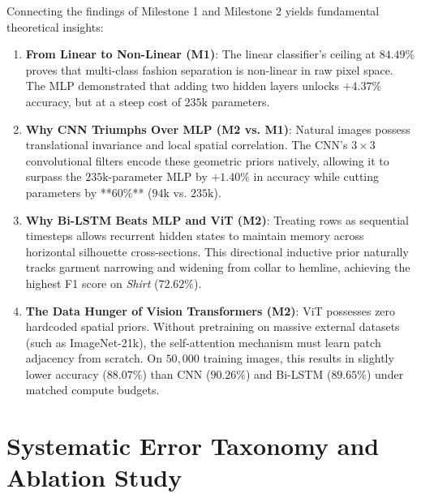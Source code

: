 \documentclass[11pt, a4paper]{article}
\begin{document}
Connecting the findings of Milestone 1 and Milestone 2 yields fundamental theoretical insights:
\begin{enumerate}
  \item \textbf{From Linear to Non-Linear (M1)}: The linear classifier's ceiling at $84.49\%$ proves that multi-class fashion separation is non-linear in raw pixel space. The MLP demonstrated that adding two hidden layers unlocks $+4.37\%$ accuracy, but at a steep cost of $235\text{k}$ parameters.
  \item \textbf{Why CNN Triumphs Over MLP (M2 vs. M1)}: Natural images possess translational invariance and local spatial correlation. The CNN's $3 \times 3$ convolutional filters encode these geometric priors natively, allowing it to surpass the $235\text{k}$-parameter MLP by $+1.40\%$ in accuracy while cutting parameters by **$60\%$** ($94\text{k}$ vs. $235\text{k}$).
  \item \textbf{Why Bi-LSTM Beats MLP and ViT (M2)}: Treating rows as sequential timesteps allows recurrent hidden states to maintain memory across horizontal silhouette cross-sections. This directional inductive prior naturally tracks garment narrowing and widening from collar to hemline, achieving the highest F1 score on \textit{Shirt} ($72.62\%$).
  \item \textbf{The Data Hunger of Vision Transformers (M2)}: ViT possesses zero hardcoded spatial priors. Without pretraining on massive external datasets (such as ImageNet-21k), the self-attention mechanism must learn patch adjacency from scratch. On $50{,}000$ training images, this results in slightly lower accuracy ($88.07\%$) than CNN ($90.26\%$) and Bi-LSTM ($89.65\%$) under matched compute budgets.
\end{enumerate}

\section{Systematic Error Taxonomy and Ablation Study}
\label{sec:error_taxonomy}
\end{document}

